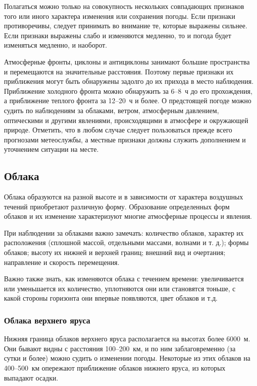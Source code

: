 Полагаться можно только на совокупность нескольких совпадающих
признаков того или иного характера изменения или сохранения
погоды. Если признаки противоречивы, следует принимать во внимание те,
которые выражены сильнее. Если признаки выражены слабо и изменяются
медленно, то и погода будет изменяться медленно, и наоборот.

Атмосферные фронты, циклоны и антициклоны занимают большие
пространства и перемещаются на значительные расстояния. Поэтому первые
признаки их приближения могут быть обнаружены задолго до их прихода в
место наблюдения. Приближение холодного фронта можно обнаружить за 6--8~ч
до его прохождения, а приближение теплого фронта за 12--20~ч и
более. О предстоящей погоде можно судить по наблюдениям за облаками,
ветром, атмосферным давлением, оптическими и другими явлениями,
происходящими в атмосфере и окружающей природе. Отметить, что в любом
случае следует пользоваться прежде всего прогнозами метеослужбы, а
местные признаки должны служить дополнением и уточнением ситуации на
месте.

\subsection{Облака}

Облака образуются на разной высоте и в зависимости от характера
воздушных течений приобретают различную форму. Образование
определенных форм облаков и их изменение характеризуют многие
атмосферные процессы и явления.

При наблюдении за облаками важно замечать: количество облаков,
характер их расположения (сплошной массой, отдельными массами, волнами
и т. д.); формы облаков; высоту их нижней и верхней границ; внешний
вид и очертания; направление и скорость перемещения.

Важно также знать, как изменяются облака с течением времени:
увеличивается или уменьшается их количество, уплотняются они или
становятся тоньше, с какой стороны горизонта они впервые появляются,
цвет облаков и т.д.

\subsubsection{Облака верхнего яруса}

Нижняя граница облаков верхнего яруса располагается на высотах более
6000~м. Они бывают видны с расстояния 100--200~км, и по ним
заблаговременно (за сутки и более) можно судить о изменении
погоды. Некоторые из этих облаков на 400--500~км опережают
приближение облаков нижнего яруса, из которых выпадают осадки.

